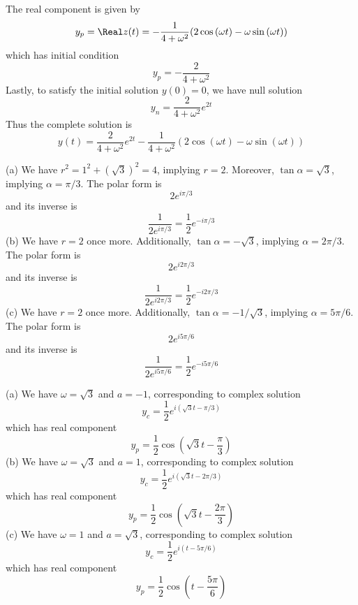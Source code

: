 \documentclass[a4paper]{article}
\begin{document}
The real component is given by
\[
	y_{p} = \Real z \!\left( t \right) = -\frac{1}{4 + \omega^{2}} \!\left( 2 \cos\left( \omega t \right) - \omega \sin\left( \omega t \right) \right) 
\]
which has initial condition
\[
	y_{p} = - \frac{2}{4 + \omega^{2}}
\]
Lastly, to satisfy the initial solution \(y \!\left( 0 \right) = 0\), we have null solution
\[
	y_{n} = \frac{2}{4 + \omega^{2}} e^{2t}
\]
Thus the complete solution is
\[
	y \!\left( t \right) = \frac{2}{4 + \omega^{2}}e^{2t} - \frac{1}{4 + \omega^{2}} \!\left( 2 \cos\left( \omega t \right) - \omega \sin\left( \omega t \right) \right) 
\]


(a) We have \(r^{2} = 1^{2} + \!\left( \sqrt{3} \right)^{2} = 4 \), implying \(r = 2\). Moreover, \(\tan \alpha = \sqrt{3}\), implying \(\alpha = \pi / 3\). The polar form is
\[
	2e^{i \pi / 3}
\]
and its inverse is
\[
	\frac{1}{2e^{i \pi / 3}} = \frac{1}{2} e^{-i \pi /3}
\]
(b) We have \(r = 2\) once more. Additionally, \(\tan \alpha = -\sqrt{3}\), implying \(\alpha = 2 \pi / 3\). The polar form is
\[
	2e^{i 2 \pi / 3}
\]
and its inverse is
\[
        \frac{1}{2 e^{i 2\pi /3}} = \frac{1}{2} e^{- i 2\pi / 3}
\]
(c) We have \(r = 2\) once more. Additionally, \(\tan \alpha = -1 / \sqrt{3}\), implying \(\alpha = 5 \pi / 6\). The polar form is
\[
	2e^{i 5 \pi / 6} 
\]
and its inverse is
\[
	\frac{1}{2e^{i 5 \pi / 6}} = \frac{1}{2} e^{-i 5 \pi / 6}
\]


(a) We have \(\omega = \sqrt{3}\) and \(a = -1\), corresponding to complex solution
\[
	y_{c} = \frac{1}{2} e^{i \!\left( \sqrt{3} t - \pi / 3 \right) }
\]
which has real component
\[
	y_{p} = \frac{1}{2} \cos\left( \sqrt{3}t - \frac{\pi }{3}\right)
\]
(b) We have \(\omega = \sqrt{3}\) and \(a = 1\), corresponding to complex solution
\[
	y_{c} = \frac{1}{2} e^{i \!\left( \sqrt{3}t - 2 \pi / 3 \right) }
\]
which has real component
\[
	y_{p} = \frac{1}{2} \cos\left( \sqrt{3}t - \frac{2 \pi }{3} \right)
\]
(c) We have \(\omega = 1\) and \(a = \sqrt{3}\), corresponding to complex solution
\[
	y_{c} = \frac{1}{2} e^{i \!\left( t - 5 \pi / 6 \right) }
\]
which has real component
\[
	y_{p} = \frac{1}{2} \cos\left( t - \frac{5 \pi }{6} \right)
\]
\end{document}
